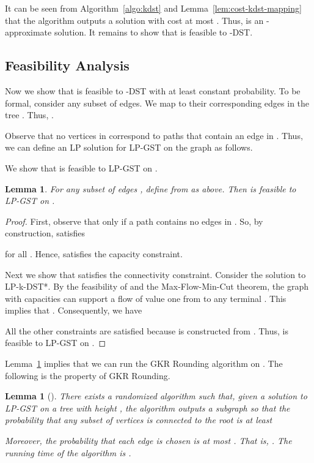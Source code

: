 \documentclass[11pt]{article}
\newtheorem{lemma}[theorem]{Lemma}
\theoremstyle{definition}
\theoremstyle{remark}
\begin{document}
It can be seen from Algorithm~\ref{algo:kdst} and 
Lemma~\ref{lem:cost-kdst-mapping} that 
the algorithm outputs a solution  with cost 
at most .
Thus,  is an -approximate solution.
It remains to show that  is feasible to -DST.

\subsection{Feasibility Analysis}
\label{sec:feasibility-analysis}

Now we show that  is feasible to -DST 
with at least constant probability.
To be formal, consider any subset  of  edges.
We map  to their corresponding edges  in the tree .
Thus, .

Observe that no vertices in  correspond
to paths that contain an edge in .
Thus, we can define an LP solution  for LP-GST
on the graph  as follows.


We show that  is feasible to LP-GST on .
\begin{lemma}
\label{lem:feasibility-of-calG-minus-F}
For any subset of edges , 
define  from  as above. 
Then  is feasible to LP-GST on .
\end{lemma}

\begin{proof}
First, observe that  only if a path  contains no edges in .
So, by construction,  satisfies

for all .
Hence,  satisfies the capacity constraint.

Next we show that  satisfies the connectivity constraint.
Consider the solution  to LP-k-DST*.
By the feasibility of  and the Max-Flow-Min-Cut theorem, 
the graph  with capacities 
can support a flow of value one from  to any terminal . 
This implies that
.
Consequently, we have 


All the other constraints are satisfied 
because  is constructed from .
Thus,  is feasible to LP-GST on .
\end{proof}

Lemma~\ref{lem:feasibility-of-calG-minus-F} implies that
we can run the GKR Rounding algorithm on .
The following is the property of GKR Rounding.

\begin{lemma}[\cite{GargKR00}]
\label{lem:prop-of-GKR}
There exists a randomized algorithm such that,
given a solution  to LP-GST on a tree 
with height ,
the algorithm outputs a subgraph 
so that the probability that any subset of vertices 
 is connected to the root is at least

Moreover, the probability that each edge is chosen is at most .
That is, .
The running time of the algorithm is . 
\end{lemma}
 
\end{document}
